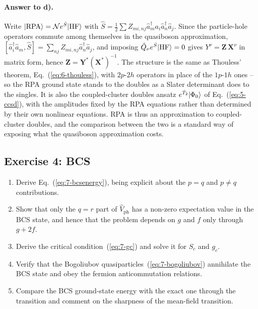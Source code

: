 \paragraph{Answer to d).}
Write $\vert \mathrm{RPA} \rangle=\mathcal{N}e^{\hat{S}}\vert \mathrm{HF} \rangle$ with
$\hat{S}=\tfrac12\sum Z_{mi,nj}\hat{a}^{\dagger}_{m}\hat{a}_{i}
\hat{a}^{\dagger}_{n}\hat{a}_{j}$.  Since the particle-hole operators commute
among themselves in the quasiboson approximation,
$[\hat{a}^{\dagger}_{i}\hat{a}_{m},\hat{S}]
=\sum_{nj}Z_{mi,nj}\hat{a}^{\dagger}_{n}\hat{a}_{j}$, and imposing
$\hat{Q}_{\nu}e^{\hat{S}}\vert \mathrm{HF} \rangle=0$ gives
$Y^{\nu}=\bm{Z}\,\bm{X}^{\nu}$ in matrix form, hence
$\bm{Z}=\bm{Y}^{*}(\bm{X}^{*})^{-1}$.  The structure is the same as Thouless'
theorem, Eq.~(\ref{eq:6-thouless}), with $2p$-$2h$ operators in place of the
$1p$-$1h$ ones -- so the RPA ground state stands to the doubles as a Slater
determinant does to the singles.  It is also the coupled-cluster doubles
ansatz $e^{\hat{T}_2}\vert \Phi_0 \rangle$ of Eq.~(\ref{eq:5-ccsd}), with the
amplitudes fixed by the RPA equations rather than determined by their own
nonlinear equations.  RPA is thus an approximation to coupled-cluster doubles,
and the comparison between the two is a standard way of exposing what the
quasiboson approximation costs.

\subsection*{Exercise 4: BCS}
\label{ex:7-bcs}

\begin{enumerate}
  \item[a)] Derive Eq.~(\ref{eq:7-bcsenergy}), being explicit about the
  $p=q$ and $p\ne q$ contributions.
  \item[b)] Show that only the $q=r$ part of $\hat{V}_{\mathrm{ph}}$ has a
  non-zero expectation value in the BCS state, and hence that the problem
  depends on $g$ and $f$ only through $g+2f$.
  \item[c)] Derive the critical condition~(\ref{eq:7-gc}) and solve it for
  $S_c$ and $g_c$.
  \item[d)] Verify that the Bogoliubov quasiparticles~(\ref{eq:7-bogoliubov})
  annihilate the BCS state and obey the fermion anticommutation relations.
  \item[e)] Compare the BCS ground-state energy with the exact one through
  the transition and comment on the sharpness of the mean-field transition.
\end{enumerate}

